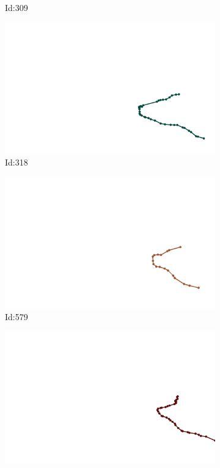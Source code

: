 \documentclass[12pt,twoside]{report}
\begin{document}
\begin{figure}
\begin{subfigure}[b]{0.20\textwidth}
\caption{Id:309}
\end{subfigure}
\begin{subfigure}[b]{0.20\textwidth}
\centering
\includegraphics[width=\textwidth]{../../trajectories/318.png}
\caption{Id:318}
\end{subfigure}
\begin{subfigure}[b]{0.20\textwidth}
\centering
\includegraphics[width=\textwidth]{../../trajectories/579.png}
\caption{Id:579}
\end{subfigure}
\begin{subfigure}[b]{0.20\textwidth}
\centering
\includegraphics[width=\textwidth]{../../trajectories/638.png}

\end{subfigure}
\end{figure}
\end{document}

